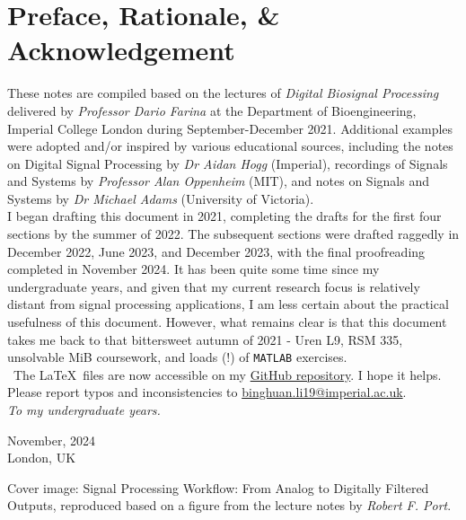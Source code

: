 \section*{Preface, Rationale, \& Acknowledgement}
These notes are compiled based on the lectures of \textit{Digital Biosignal Processing} delivered by \textit{Professor Dario Farina} at the Department of Bioengineering, Imperial College London during September-December 2021. Additional examples were adopted and/or inspired by various educational sources, including the notes on Digital Signal Processing by \textit{Dr Aidan Hogg} (Imperial), recordings of Signals and Systems by \textit{Professor Alan Oppenheim} (MIT), and notes on Signals and Systems by \textit{Dr Michael Adams} (University of Victoria). \\

I began drafting this document in 2021, completing the drafts for the first four sections by the summer of 2022. The subsequent sections were drafted raggedly in December 2022, June 2023, and December 2023, with the final proofreading completed in November 2024. It has been quite some time since my undergraduate years, and given that my current research focus is relatively distant from signal processing applications, I am less certain about the practical usefulness of this document. However, what remains clear is that this document takes me back to that bittersweet autumn of 2021 - Uren L9, RSM 335, unsolvable MiB coursework, and loads (!) of \texttt{MATLAB} exercises.\\

\faGithub \ The \LaTeX \ files are now accessible on my \href{https://github.com/binghuan-li/Notes-and-Formula-Sheets}{GitHub repository}. I hope it helps. Please report typos and inconsistencies to \href{mailto:binghuan.li19@imperial.ac.uk}{binghuan.li19@imperial.ac.uk}. \\

\textit{To my undergraduate years.}

\begin{flushright}
November, 2024\\
London, UK
\end{flushright}

\vfill
{\color{gray}
Cover image: Signal Processing Workflow: From Analog to Digitally Filtered Outputs, reproduced based on a figure from the lecture notes by \textit{Robert F. Port}.
}